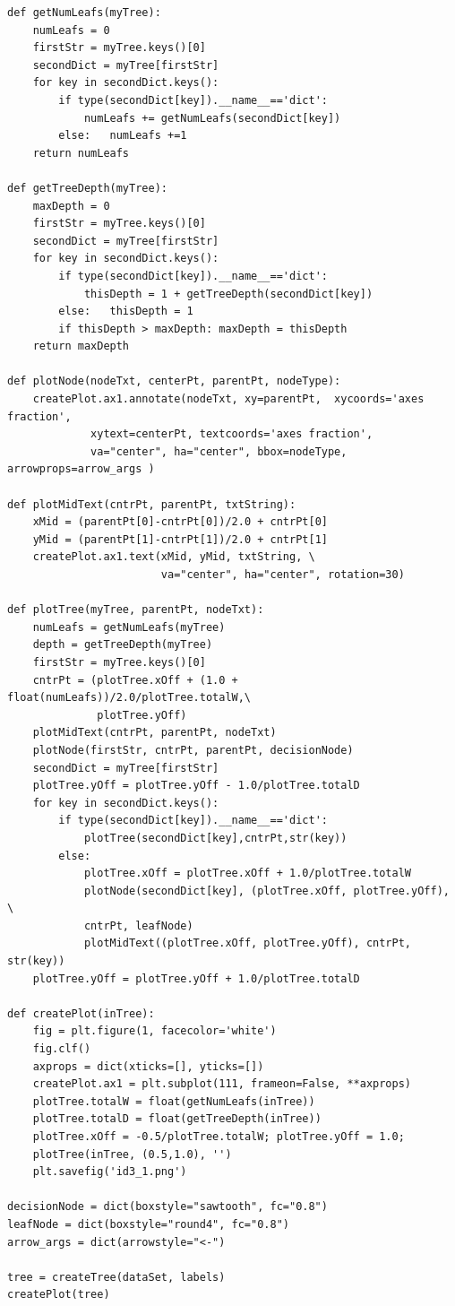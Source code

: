 \documentclass[12pt,fleqn]{article}\usepackage{../../common}
\begin{document}
\begin{verbatim}
def getNumLeafs(myTree):
    numLeafs = 0
    firstStr = myTree.keys()[0]
    secondDict = myTree[firstStr]
    for key in secondDict.keys():
        if type(secondDict[key]).__name__=='dict':
            numLeafs += getNumLeafs(secondDict[key])
        else:   numLeafs +=1
    return numLeafs

def getTreeDepth(myTree):
    maxDepth = 0
    firstStr = myTree.keys()[0]
    secondDict = myTree[firstStr]
    for key in secondDict.keys():
        if type(secondDict[key]).__name__=='dict':
            thisDepth = 1 + getTreeDepth(secondDict[key])
        else:   thisDepth = 1
        if thisDepth > maxDepth: maxDepth = thisDepth
    return maxDepth

def plotNode(nodeTxt, centerPt, parentPt, nodeType):
    createPlot.ax1.annotate(nodeTxt, xy=parentPt,  xycoords='axes fraction',
             xytext=centerPt, textcoords='axes fraction',
             va="center", ha="center", bbox=nodeType, arrowprops=arrow_args )
    
def plotMidText(cntrPt, parentPt, txtString):
    xMid = (parentPt[0]-cntrPt[0])/2.0 + cntrPt[0]
    yMid = (parentPt[1]-cntrPt[1])/2.0 + cntrPt[1]
    createPlot.ax1.text(xMid, yMid, txtString, \
                        va="center", ha="center", rotation=30)

def plotTree(myTree, parentPt, nodeTxt):
    numLeafs = getNumLeafs(myTree)  
    depth = getTreeDepth(myTree)
    firstStr = myTree.keys()[0]     
    cntrPt = (plotTree.xOff + (1.0 + float(numLeafs))/2.0/plotTree.totalW,\
              plotTree.yOff)
    plotMidText(cntrPt, parentPt, nodeTxt)
    plotNode(firstStr, cntrPt, parentPt, decisionNode)
    secondDict = myTree[firstStr]
    plotTree.yOff = plotTree.yOff - 1.0/plotTree.totalD
    for key in secondDict.keys():
        if type(secondDict[key]).__name__=='dict':
            plotTree(secondDict[key],cntrPt,str(key))        
        else:  
            plotTree.xOff = plotTree.xOff + 1.0/plotTree.totalW
            plotNode(secondDict[key], (plotTree.xOff, plotTree.yOff), \
            cntrPt, leafNode)
            plotMidText((plotTree.xOff, plotTree.yOff), cntrPt, str(key))
    plotTree.yOff = plotTree.yOff + 1.0/plotTree.totalD

def createPlot(inTree):
    fig = plt.figure(1, facecolor='white')
    fig.clf()
    axprops = dict(xticks=[], yticks=[])
    createPlot.ax1 = plt.subplot(111, frameon=False, **axprops)    
    plotTree.totalW = float(getNumLeafs(inTree))
    plotTree.totalD = float(getTreeDepth(inTree))
    plotTree.xOff = -0.5/plotTree.totalW; plotTree.yOff = 1.0;
    plotTree(inTree, (0.5,1.0), '')
    plt.savefig('id3_1.png')

decisionNode = dict(boxstyle="sawtooth", fc="0.8")
leafNode = dict(boxstyle="round4", fc="0.8")
arrow_args = dict(arrowstyle="<-")

tree = createTree(dataSet, labels)
createPlot(tree)
\end{verbatim}
\end{document}

